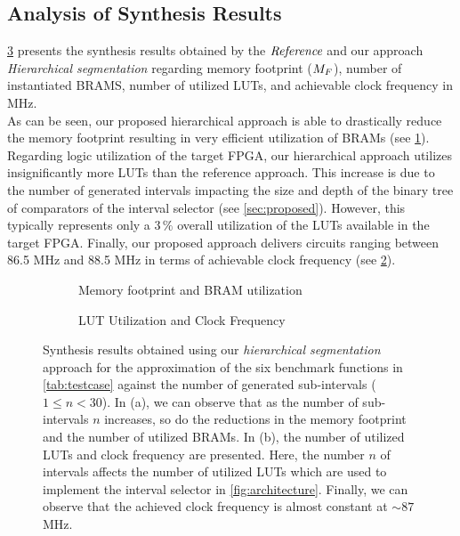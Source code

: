 \subsection{Analysis of Synthesis Results}
\cref{fig:resSynthesis} presents the synthesis results obtained by the $\textit{Reference}$ and {our approach} {\textit{Hierarchical segmentation}} regarding memory footprint ($M_{F}$), number of instantiated BRAMS, number of utilized LUTs, and {achievable clock} frequency in MHz.\\
As can be seen, our proposed hierarchical approach is able to drastically reduce the memory footprint resulting in very efficient utilization of BRAMs (see \cref{res:MFBRAM}). 
Regarding logic utilization of the target FPGA, our hierarchical approach utilizes {insignificantly more LUTs} than the reference approach. {This increase is} due to the number of generated intervals impacting the size and depth of the binary tree of comparators of the interval selector (see \cref{sec:proposed}).
However, this {typically} represents {only} a $3\,\%$ overall utilization of the LUTs available in the target FPGA.
Finally, our proposed approach {delivers circuits ranging} between 86.5 MHz and 88.5 MHz in terms of {achievable clock} frequency (see \cref{res:LUTs}).
{\begin{figure}[!htb]
\centering
    \begin{subfigure}[b]{\textwidth}
	\centering
	\resizebox{0.76\textwidth}{!}{
		\begin{tikzpicture}
		\ResourcesMemoryFootprint
		\end{tikzpicture}}
		\caption{\label{res:MFBRAM} Memory footprint and BRAM utilization}
    \end{subfigure}
    \begin{subfigure}[b]{\textwidth}
	\centering
        \vspace{0.25cm}
	\resizebox{0.75\textwidth}{!}{
		\begin{tikzpicture}
		\ResourcesLUTFrequency
		\end{tikzpicture}}
		\caption{\label{res:LUTs} LUT Utilization and {Clock} Frequency}
    \end{subfigure}
    \caption{\label{fig:resSynthesis} 
    Synthesis results obtained {using our} \textit{hierarchical segmentation} approach for the approximation of {the six} benchmark functions in \cref{tab:testcase} against the number of generated sub-intervals ($1\leq n<30$).
    In (a), we can observe that as the number of sub-intervals {$n$} increases, {so do the} reductions in the memory footprint and the number of utilized BRAMs.
    In (b), the number of utilized LUTs and {clock} frequency are presented.
    Here, the number {$n$} of intervals affects the number of utilized LUTs which are used to implement the interval selector {in \cref{fig:architecture}.}
    Finally, we can observe that the {achieved clock} frequency is almost constant {at} $\sim 87$ MHz. 
    }
\end{figure}}
